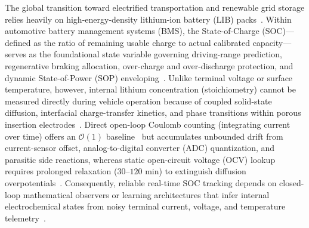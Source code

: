 \documentclass[11pt,a4paper]{article}
\begin{document}
The global transition toward electrified transportation and renewable grid storage relies heavily on high-energy-density lithium-ion battery (LIB) packs~\cite{Tarascon2001,Lu2013review}. Within automotive battery management systems (BMS), the State-of-Charge (SOC)---defined as the ratio of remaining usable charge to actual calibrated capacity---serves as the foundational state variable governing driving-range prediction, regenerative braking allocation, over-charge and over-discharge protection, and dynamic State-of-Power (SOP) enveloping~\cite{Plett2004part1,Xiong2018joint,Farmann2016peukert}. Unlike terminal voltage or surface temperature, however, internal lithium concentration (stoichiometry) cannot be measured directly during vehicle operation because of coupled solid-state diffusion, interfacial charge-transfer kinetics, and phase transitions within porous insertion electrodes~\cite{Doyle1993,Torchio2016pybam}. Direct open-loop Coulomb counting (integrating current over time) offers an $\mathcal{O}(1)$ baseline~\cite{Plett2004part1} but accumulates unbounded drift from current-sensor offset, analog-to-digital converter (ADC) quantization, and parasitic side reactions, whereas static open-circuit voltage (OCV) lookup requires prolonged relaxation ($30\text{--}120\text{ min}$) to extinguish diffusion overpotentials~\cite{Roscher2011hysteresis,Verbrugge2004hysteresis}. Consequently, reliable real-time SOC tracking depends on closed-loop mathematical observers or learning architectures that infer internal electrochemical states from noisy terminal current, voltage, and temperature telemetry~\cite{Plett2004part2,Hu2012ecm,Ren2019aging}.
\end{document}
